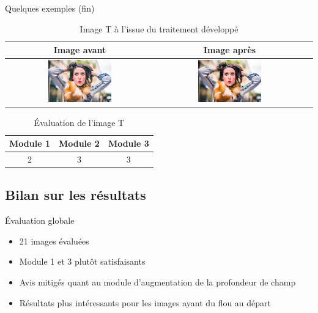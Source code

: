 \documentclass{beamer}
\begin{document}
\begin{frame}{Quelques exemples (fin)}
\begin{table}
\centering
\begin{tabular}{|c|c|c|}	
\hline \textbf{Image avant}  &  \textbf{Image après}  \\ \hline 
\includegraphics[width=0.45\textwidth]{Resultats/pt_avant} & \includegraphics[width=0.45\textwidth]{Resultats/pt_apres} \\ \hline   
\end{tabular}
\caption{Image T à l'issue du traitement développé}
\end{table}

\begin{table}[htbp]
\centering
\begin{tabular}{|c|c|c|}
\hline
Module 1 & Module 2 & Module 3\\ \hline
2 & 3 & 3\\ \hline
\end{tabular}
\caption{Évaluation de l'image T}
\end{table}
\end{frame}

\subsection{Bilan sur les résultats}

\begin{frame}{Évaluation globale}
\begin{itemize}
\item 21 images évaluées
\item Module 1 et 3 plutôt satisfaisants
\item Avis mitigés quant au module d'augmentation de la profondeur de champ
\item Résultats plus intéressants pour les images ayant du flou au départ
\end{itemize}
\end{frame}
\end{document}
